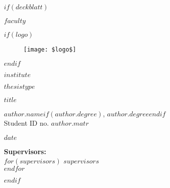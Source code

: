 \documentclass[oneside,12pt,a4paper,bibliography=totoc,numbers=noenddot,table]{scrreprt} %
\begin{document}

$if(deckblatt)$
\begin{titlepage}
\thispagestyle{empty}
\begin{center}

\begin{large}
\textsf{\textbf{$faculty$}}\\
\end{large}

\vfill

$if(logo)$
\begin{figure}[h!]
    \centering
    \texttt{[image: \$logo\$]}
\end{figure}
$endif$

\vfill

\begin{large}
\textsf{\textbf{$institute$}}\\
\end{large}

\vfill

\begin{Large}
    \textsf{\textbf{$thesistype$}}\\
\end{Large}

\vfill

\begin{LARGE}
    \textsf{\textbf{$title$}}\\ %
\end{LARGE}

\vfill

\begin{large}
    \textsf{\textbf{$author.name$}$if(author.degree)$, $author.degree$$endif$}\\[0.5em]
    \textsf{Student ID no. $author.matr$}\\

    \vfill

    \textsf{$date$}

    \vfill

    \textsf{\textbf{Supervisors:}}\\[1em]
    $for(supervisors)$
    \textsf{$supervisors$}\\[0.5em]
    $endfor$
\end{large}

\end{center}

\end{titlepage}
\thispagestyle{empty}
\cleardoublepage
\newpage
$endif$
\end{document}
